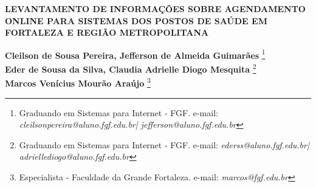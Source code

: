 \documentclass[12pt]{article}
\begin{document}

%



\begin{center}
\textbf{\Large{LEVANTAMENTO DE INFORMAÇÕES SOBRE AGENDAMENTO ONLINE PARA SISTEMAS DOS POSTOS DE SAÚDE EM FORTALEZA E REGIÃO METROPOLITANA}}\\
\end{center}

\vspace*{0.2cm}

\begin{flushright}
 {\bf Cleilson de Sousa Pereira, Jefferson de Almeida Guimarães} \footnote[1]{Graduando em Sistemas para Internet - FGF. e-mail: \it cleilsonpereira@aluno.fgf.edu.br\hbox      | jefferson@aluno.fgf.edu.br}  \\
  {\bf Eder de Sousa da Silva, Claudia Adrielle Diogo Mesquita} \footnote[2]{Graduando em Sistemas para Internet - FGF. e-mail: \it ederss@aluno.fgf.edu.br\hbox |
  adriellediogo@aluno.fgf.edu.br}  \\
  {\bf Marcos Venícius Mourão Araújo} \footnote[3]{Especialista - Faculdade da Grande Fortaleza. e-mail: \it marcos@fgf.edu.br}   \\
\end{flushright}

\vspace*{0.5cm}

\end{document}
